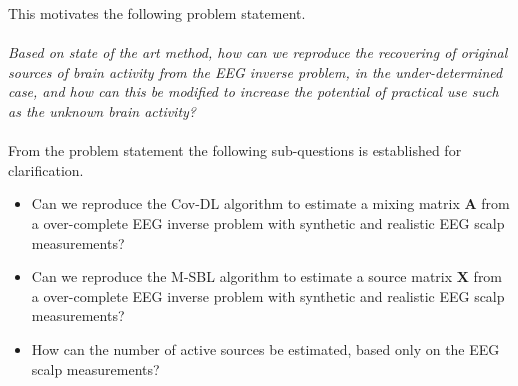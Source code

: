 This motivates the following problem statement.         
\\ \\
\textit{Based on state of the art method, how can we reproduce the recovering of original sources of brain activity from the EEG inverse problem, in the under-determined case, and how can this be modified to increase the potential of practical use such as the unknown brain activity?}
\\ \\
From the problem statement the following sub-questions is established for clarification.
\begin{itemize}
\item Can we reproduce the Cov-DL algorithm to estimate a mixing matrix $\mathbf{A}$ from a over-complete EEG inverse problem with synthetic and realistic EEG scalp measurements?
\item Can we reproduce the M-SBL algorithm to estimate a source matrix $\mathbf{X}$ from a over-complete EEG inverse problem with synthetic and realistic EEG scalp measurements?
\item How can the number of active sources be estimated, based only on the EEG scalp measurements? 
\end{itemize}

 